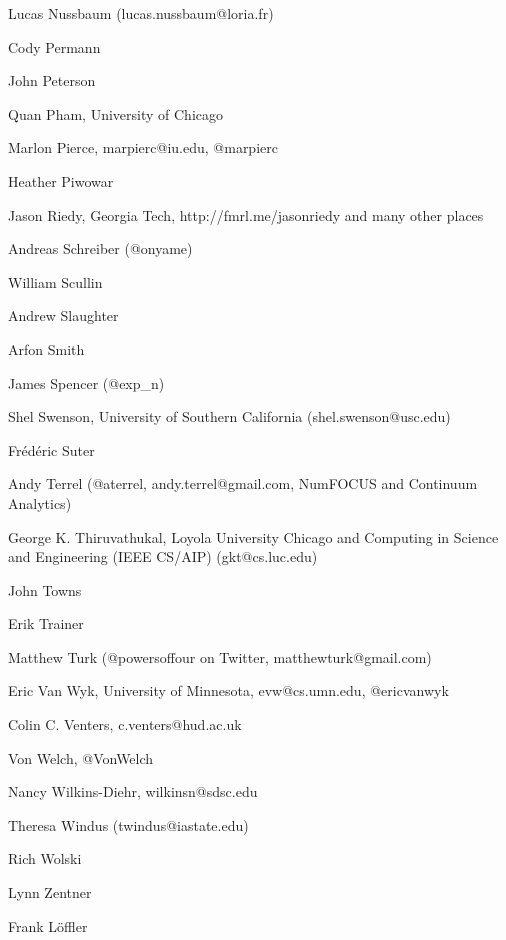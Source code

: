 \documentclass[11pt, oneside]{amsart}
\begin{document}
Lucas Nussbaum (lucas.nussbaum@loria.fr)

Cody Permann

John Peterson

Quan Pham, University of Chicago

Marlon Pierce, marpierc@iu.edu, @marpierc

Heather Piwowar

Jason Riedy, Georgia Tech, http://fmrl.me/jasonriedy and many other places

Andreas Schreiber (@onyame)

William Scullin

Andrew Slaughter

Arfon Smith

James Spencer (@exp\_n)

Shel Swenson, University of Southern California (shel.swenson@usc.edu)

Fr\'{e}d\'{e}ric Suter

Andy Terrel (@aterrel, andy.terrel@gmail.com, NumFOCUS and Continuum Analytics)

George K. Thiruvathukal, Loyola University Chicago and Computing in Science and Engineering (IEEE CS/AIP) (gkt@cs.luc.edu)

John Towns

Erik Trainer

Matthew Turk (@powersoffour on Twitter, matthewturk@gmail.com)

Eric Van Wyk, University of Minnesota, evw@cs.umn.edu, @ericvanwyk

Colin C. Venters, c.venters@hud.ac.uk

Von Welch, @VonWelch

Nancy Wilkins-Diehr, wilkinsn@sdsc.edu

Theresa Windus (twindus@iastate.edu)

Rich Wolski

Lynn Zentner

Frank Löffler






\end{document}
